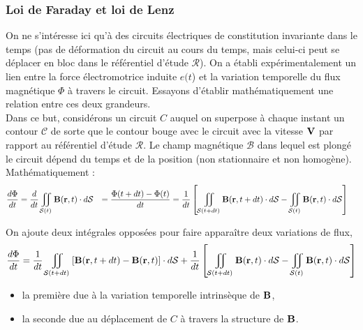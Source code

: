 \documentclass[11pt,a4paper]{report}
\begin{document}
	\subsubsection{Loi de Faraday et loi de Lenz}
	
	On ne s'intéresse ici qu'à des circuits électriques de constitution invariante dans le temps (pas de déformation du circuit au cours du temps, mais celui-ci peut se déplacer en bloc dans le référentiel d'étude $\mathcal{R}$). On a établi expérimentalement un lien entre la force électromotrice induite $e(t$) et la variation temporelle du flux magnétique $\Phi$ à travers le circuit. Essayons d'établir mathématiquement une relation entre ces deux grandeurs.\\
	
	Dans ce but, considérons un circuit $C$ auquel on superpose à chaque instant un contour $\mathcal{C}$ de sorte que le contour bouge avec le circuit avec la vitesse $\bold{V}$ par rapport au référentiel d'étude $\mathcal{R}$. Le champ magnétique $\mathcal{B}$ dans lequel est plongé le circuit dépend du temps et de la position (non stationnaire et non homogène).\\

	Mathématiquement :
	\begin{align}
		\frac{d\Phi}{dt} & = \frac{d}{dt}\iint_{\mathcal{S}(t)}\bold{B}(\bold{r},t)\cdot d\bold{\mathcal{S}}
					     & = \frac{\Phi(t+dt) - \Phi(t)}{dt}
					     & = \frac{1}{dt}\left[\iint_{\mathcal{S}(t+dt)}\bold{B}(\bold{r},t+dt)\cdot d\bold{\mathcal{S}} 
					     - \iint_{\mathcal{S}(t)}\bold{B}(\bold{r},t)\cdot d\bold{\mathcal{S}}\right]
	\end{align}

	On ajoute deux intégrales opposées pour faire apparaître deux variations de flux, 
	\begin{equation}
		\frac{d\Phi}{dt} = \frac{1}{dt}\iint_{\mathcal{S}(t+dt)}\left[\bold{B}(\bold{r},t+dt)-\bold{B}(\bold{r},t)\right]\cdot d\bold{\mathcal{S}} 
						 + \frac{1}{dt}\left[\iint_{\mathcal{S}(t+dt)}\bold{B}(\bold{r},t)\cdot d\bold{\mathcal{S}}
						 -\iint_{\mathcal{S}(t)}\bold{B}(\bold{r},t)\cdot d\bold{\mathcal{S}} \right]
	\end{equation}
	\begin{itemize}
		\item la première due à la variation temporelle intrinsèque de $\bold{B}$,
		\item la seconde due au déplacement de $C$ à travers la structure de $\bold{B}$.
	\end{itemize}
\end{document}
